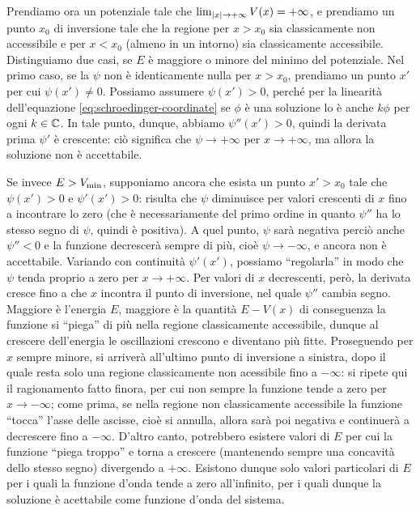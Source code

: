 Prendiamo ora un potenziale tale che $\lim_{\left|{x}\right|\to+\infty}V(x)=+\infty$, e prendiamo un punto $x_0$ di inversione tale che la regione per $x>x_0$ sia classicamente non accessibile e per $x<x_0$ (almeno in un intorno) sia classicamente accessibile.
Distinguiamo due casi, se $E$ è maggiore o minore del minimo del potenziale.
Nel primo caso, se la $\psi$ non è identicamente nulla per $x>x_0$, prendiamo un punto $x'$ per cui $\psi(x')\ne 0$.
Possiamo assumere $\psi(x')>0$, perch\'e per la linearità dell'equazione \eqref{eq:schroedinger-coordinate} se $\phi$ è una soluzione lo è anche $k\phi$ per ogni $k\in\mathbb{C}$.
In tale punto, dunque, abbiamo $\psi''(x')>0$, quindi la derivata prima $\psi'$ è crescente: ciò significa che $\psi\to+\infty$ per $x\to+\infty$, ma allora la soluzione non è accettabile.

Se invece $E>V_\textup{min}$, supponiamo ancora che esista un punto $x'>x_0$ tale che $\psi(x')>0$ e $\psi'(x')>0$: risulta che $\psi$ diminuisce per valori crescenti di $x$ fino a incontrare lo zero (che è necessariamente del primo ordine in quanto $\psi''$ ha lo stesso segno di $\psi$, quindi è positiva).
A quel punto, $\psi$ sarà negativa perciò anche $\psi''<0$ e la funzione decrescerà sempre di più, cioè $\psi\to-\infty$, e ancora non è accettabile.
Variando con continuità $\psi'(x')$, possiamo ``regolarla'' in modo che $\psi$ tenda proprio a zero per $x\to+\infty$.
Per valori di $x$ decrescenti, però, la derivata cresce fino a che $x$ incontra il punto di inversione, nel quale $\psi''$ cambia segno.
Maggiore è l'energia $E$, maggiore è la quantità $E-V(x)$ di conseguenza la funzione si ``piega'' di più nella regione classicamente accessibile, dunque al crescere dell'energia le oscillazioni crescono e diventano più fitte.
Proseguendo per $x$ sempre minore, si arriverà all'ultimo punto di inversione a sinistra, dopo il quale resta solo una regione classicamente non acessibile fino a $-\infty$: si ripete qui il ragionamento fatto finora, per cui non sempre la funzione tende a zero per $x\to-\infty$; come prima, se nella regione non classicamente accessibile la funzione ``tocca'' l'asse delle ascisse, cioè si annulla, allora sarà poi negativa e continuerà a decrescere fino a $-\infty$.
D'altro canto, potrebbero esistere valori di $E$ per cui la funzione ``piega troppo'' e torna a crescere (mantenendo sempre una concavità dello stesso segno) divergendo a $+\infty$.
Esistono dunque solo valori particolari di $E$ per i quali la funzione d'onda tende a zero all'infinito, per i quali dunque la soluzione è acettabile come funzione d'onda del sistema.


